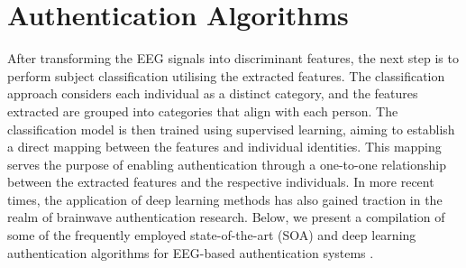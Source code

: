{\section{Authentication Algorithms}
\label{sec:Background:Authentication Algorithms}
After transforming the EEG signals into discriminant features, the next step is to perform subject classification utilising the extracted features. The classification approach considers each individual as a distinct category, and the features extracted are grouped into categories that align with each person. The classification model is then trained using supervised learning, aiming to establish a direct mapping between the features and individual identities. This mapping serves the purpose of enabling authentication through a one-to-one relationship between the extracted features and the respective individuals. 
In more recent times, the application of deep learning methods has also gained traction in the realm of brainwave authentication research. Below, we present a compilation of some of the frequently employed state-of-the-art (SOA) and deep learning authentication algorithms for EEG-based authentication systems \cite{zhang2021review}.

}
